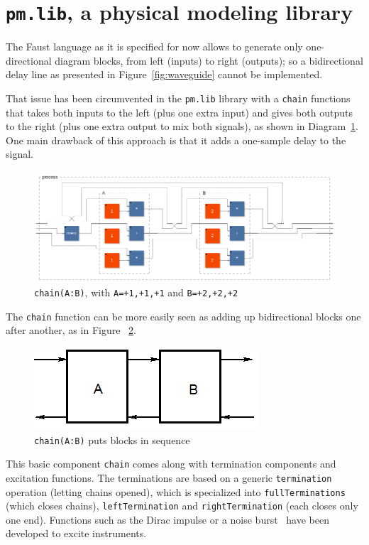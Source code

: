 \documentclass[11pt,a4paper]{article}
\begin{document}
\section{\texttt{pm.lib}, a physical modeling library }

The Faust language as it is specified for now allows to generate only one-directional diagram blocks, from left (inputs) to right (outputs); so a bidirectional delay line as presented in Figure~\ref{fig:waveguide} cannot be implemented. 

That issue has been circumvented in the \texttt{pm.lib} library with a \texttt{chain} functions that takes both inputs to the left (plus one extra input) and gives both outputs to the right (plus one extra output to mix both signals), as shown in Diagram~\ref{fig:chain}. One main drawback of this approach is that it adds a one-sample delay to the signal.

\begin{figure}[h]
	\centering
	\includegraphics[scale=0.3]{pictures/chain.png}
	\caption{\texttt{chain(A:B)}, with \texttt{A=+1,+1,+1} and \texttt{B=+2,+2,+2}}
	\label{fig:chain}
\end{figure}

 The \texttt{chain} function can be more easily seen as adding up bidirectional blocks one after another, as in Figure~ \ref{fig:chainrepresentation}.

\begin{figure}[h]
	\centering
	\includegraphics[scale=0.5]{pictures/chainrepresentation.png}
	\caption{\texttt{chain(A:B)} puts blocks in sequence}
	\label{fig:chainrepresentation}
\end{figure}

This basic component \texttt{chain} comes along with termination components and excitation functions. The terminations are based on a generic \texttt{termination} operation (letting chains opened), which is specialized into \texttt{fullTerminations} (which closes chains), \texttt{leftTermination} and \texttt{rightTermination} (each closes only one end). Functions such as the Dirac impulse or a noise burst~\cite{lac_orlarey} have been developed to excite instruments.
\end{document}

